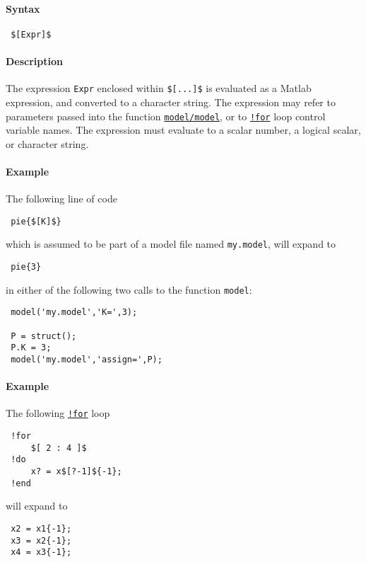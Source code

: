 


	\paragraph{Syntax}
 
 \begin{verbatim}
 $[Expr]$
 \end{verbatim}
 
 \paragraph{Description}
 
 The expression \texttt{Expr} enclosed within \texttt{\${[}...{]}\$} is
 evaluated as a Matlab expression, and converted to a character string.
 The expression may refer to parameters passed into the function
 \href{model}{\texttt{model/model}}, or to
 \href{modellang/for}{\texttt{!for}} loop control variable names. The
 expression must evaluate to a scalar number, a logical scalar, or
 character string.
 
 \paragraph{Example}
 
 The following line of code
 
 \begin{verbatim}
 pie{$[K]$}
 \end{verbatim}
 
 which is assumed to be part of a model file named \texttt{my.model},
 will expand to
 
 \begin{verbatim}
 pie{3}
 \end{verbatim}
 
 in either of the following two calls to the function \texttt{model}:
 
 \begin{verbatim}
 model('my.model','K=',3);
 
 P = struct();
 P.K = 3;
 model('my.model','assign=',P);
 \end{verbatim}
 
 \paragraph{Example}
 
 The following \href{modellang/for}{\texttt{!for}} loop
 
 \begin{verbatim}
 !for
     $[ 2 : 4 ]$
 !do
     x? = x$[?-1]${-1};
 !end
 \end{verbatim}
 
 will expand to
 
 \begin{verbatim}
 x2 = x1{-1};
 x3 = x2{-1};
 x4 = x3{-1};
 \end{verbatim}


